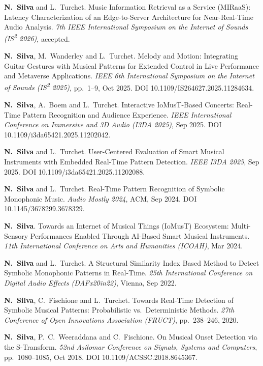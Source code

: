 \documentclass[11pt]{article}
\begin{document}
\begin{publist}[resume=pub]
  \item \textbf{N.\ Silva} and L.\ Turchet. Music Information Retrieval as a Service (MIRaaS): Latency Characterization of an Edge-to-Server Architecture for Near-Real-Time Audio Analysis. \textit{7th IEEE International Symposium on the Internet of Sounds (IS\textsuperscript{2} 2026)}, accepted.
  \item \textbf{N.\ Silva}, M.\ Wanderley and L.\ Turchet. Melody and Motion: Integrating Guitar Gestures with Musical Patterns for Extended Control in Live Performance and Metaverse Applications. \textit{IEEE 6th International Symposium on the Internet of Sounds (IS\textsuperscript{2} 2025)}, pp.\ 1--9, Oct 2025. DOI 10.1109/IS264627.2025.11284634.
  \item \textbf{N.\ Silva}, A.\ Boem and L.\ Turchet. Interactive IoMusT-Based Concerts: Real-Time Pattern Recognition and Audience Experience. \textit{IEEE International Conference on Immersive and 3D Audio (I3DA 2025)}, Sep 2025. DOI 10.1109/i3da65421.2025.11202042.
  \item \textbf{N.\ Silva} and L.\ Turchet. User-Centered Evaluation of Smart Musical Instruments with Embedded Real-Time Pattern Detection. \textit{IEEE I3DA 2025}, Sep 2025. DOI 10.1109/i3da65421.2025.11202088.
  \item \textbf{N.\ Silva} and L.\ Turchet. Real-Time Pattern Recognition of Symbolic Monophonic Music. \textit{Audio Mostly 2024}, ACM, Sep 2024. DOI 10.1145/3678299.3678329.
  \item \textbf{N.\ Silva}. Towards an Internet of Musical Things (IoMusT) Ecosystem: Multi-Sensory Performances Enabled Through AI-Based Smart Musical Instruments. \textit{11th International Conference on Arts and Humanities (ICOAH)}, Mar 2024.
  \item \textbf{N.\ Silva} and L.\ Turchet. A Structural Similarity Index Based Method to Detect Symbolic Monophonic Patterns in Real-Time. \textit{25th International Conference on Digital Audio Effects (DAFx20in22)}, Vienna, Sep 2022.
  \item \textbf{N.\ Silva}, C.\ Fischione and L.\ Turchet. Towards Real-Time Detection of Symbolic Musical Patterns: Probabilistic vs.\ Deterministic Methods. \textit{27th Conference of Open Innovations Association (FRUCT)}, pp.\ 238--246, 2020.
  \item \textbf{N.\ Silva}, P.\ C.\ Weeraddana and C.\ Fischione. On Musical Onset Detection via the S-Transform. \textit{52nd Asilomar Conference on Signals, Systems and Computers}, pp.\ 1080--1085, Oct 2018. DOI 10.1109/ACSSC.2018.8645367.
\end{publist}
\end{document}

